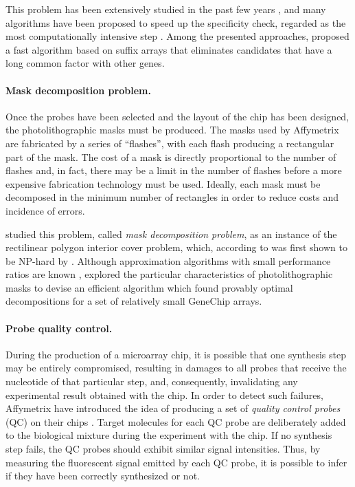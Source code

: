 This problem has been extensively studied in the past few years
\citep{Li2001,Kaderali2002,Rahmann2004}, and many algorithms have been proposed
to speed up the specificity check, regarded as the most computationally intensive
step \citep{Rahmann2002,Sung2003,Chou2004}. Among the presented approaches,
\citet{Rahmann2002} proposed a fast algorithm based on suffix arrays
\citep{Manber1990} that eliminates candidates that have a long common factor
with other genes.

\paragraph{Mask decomposition problem.} Once the probes have been selected and
the layout of the chip has been designed, the photolithographic masks must be
produced. The masks used by Affymetrix are fabricated by a series of
``flashes'', with each flash producing a rectangular part of the mask. The cost
of a mask is directly proportional to the number of flashes
\citep{Hubbell1998,Hubbell1999} and, in fact, there may be a limit in the number
of flashes before a more expensive fabrication technology must be used. Ideally,
each mask must be decomposed in the minimum number of rectangles in order to
reduce costs and incidence of errors.

\citet{Hannenhalli2002} studied this problem, called \emph{mask decomposition
problem}, as an instance of the rectilinear polygon interior cover problem,
which, according to \citet{Garey1979} was first shown to be NP-hard by
\citet{Masek}. Although approximation algorithms with small performance ratios
are known \citep{Franzblau1986}, \citet{Hannenhalli2002} explored the particular
characteristics of photolithographic masks to devise an efficient algorithm
which found provably optimal decompositions for a set of relatively small
GeneChip arrays.

\paragraph{Probe quality control.} During the production of a microarray chip,
it is possible that one synthesis step may be entirely compromised, resulting in
damages to all probes that receive the nucleotide of that particular step, and,
consequently, invalidating any experimental result obtained with the chip. In
order to detect such failures, Affymetrix have introduced the idea of producing a
set of \emph{quality control probes} (QC) on their chips \citep{Affymetrix2002}.
Target molecules for each QC probe are deliberately added to the biological
mixture during the experiment with the chip. If no synthesis step fails, the QC
probes should exhibit similar signal intensities. Thus, by measuring the
fluorescent signal emitted by each QC probe, it is possible to infer if they
have been correctly synthesized or not.

